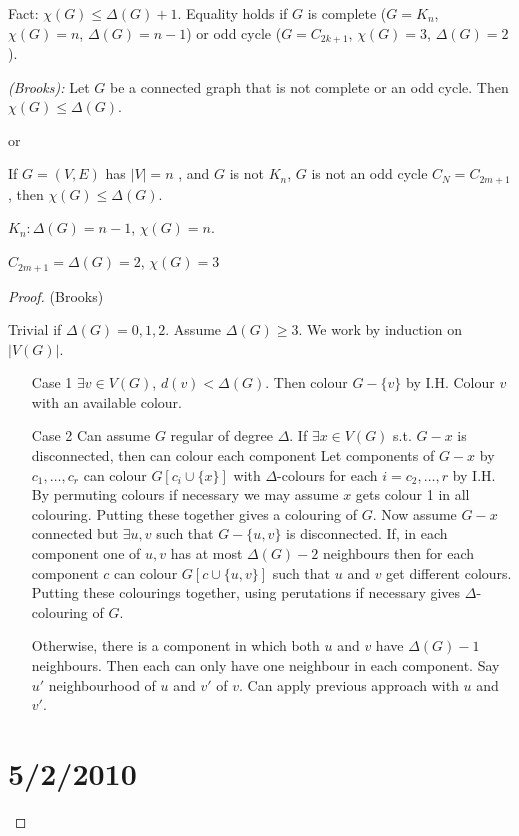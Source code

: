 \documentclass{article}
\begin{document}
Fact: $\chi(G) \leq \Delta(G) +1$.  Equality holds if $G$ is complete ($G = K_n$, $\chi(G) = n$, $\Delta(G) = n-1$) or odd cycle   ($G=C_{2k+1} $, $\chi(G)=3$, $\Delta(G)=2$).

\begin{thm}
\emph{(Brooks):} Let $G$ be a connected graph that is not complete or an odd cycle.  Then $\chi(G) \leq \Delta(G)$.

or

If $G=(V,E)$ has $|V|=n$ , and $G$ is not $K_n$, $G$ is not an odd cycle $C_N=C_{2m+1}$, then $\chi(G) \leq \Delta(G)$.
\end{thm}

$K_n: \Delta(G) = n-1$, $\chi(G)=n$.

$C_{2m+1} = \Delta(G) =2$, $\chi(G)=3$

\begin{proof}
(Brooks)

Trivial if $\Delta(G)=0,1,2$.  Assume $\Delta(G) \geq 3$. We work by induction on $|V(G)|$.

\begin{itemize}
 \item[Case 1] $\exists v \in V(G)$, $d(v) < \Delta(G)$.  Then colour $G - \{v\}$ by I.H.  Colour $v$ with an available colour.  
\item[Case 2] Can assume $G$ regular of degree $\Delta$.  If $\exists x \in V(G)$ s.t. $G-x$ is disconnected, then can colour each component   Let components of $G-x$ by $c_1, \ldots, c_r$ can colour $G[c_i \cup \{x\}]$ with $\Delta$-colours for each $i=c_2,\ldots, r$ by I.H.  By permuting colours if necessary we may assume $x$ gets colour 1 in all colouring.  Putting these together gives a colouring of $G$.  Now assume $G-x$ connected but $\exists u,v$ such that $G-\{u,v\}$ is disconnected.  If, in each component one of $u,v$ has at most $\Delta(G)-2$ neighbours then for each component $c$ can colour $G[c \cup \{u,v\}]$ such that $u$ and $v$ get different colours.  Putting these colourings together, using perutations if necessary gives $\Delta$-colouring of $G$.

Otherwise, there is a component in which both $u$ and $v$ have $\Delta(G) -1$ neighbours.  Then each can only have one neighbour in each component.  Say $u'$ neighbourhood of $u$ and $v'$ of $v$.  Can apply previous approach with $u$ and $v'$.
\end{itemize}

\section*{5/2/2010}



\end{proof}
\end{document}
